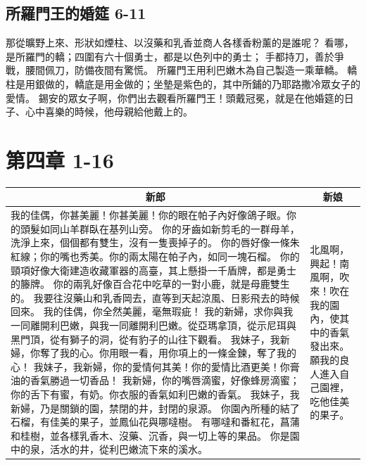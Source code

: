 \subsection{所羅門王的婚筵 6-11}
那從曠野上來、形狀如煙柱、以沒藥和乳香並商人各樣香粉薰的是誰呢？
看哪，是所羅門的轎；四圍有六十個勇士，都是以色列中的勇士；
手都持刀，善於爭戰，腰間佩刀，防備夜間有驚慌。
所羅門王用利巴嫩木為自己製造一乘華轎。
轎柱是用銀做的，轎底是用金做的；坐墊是紫色的，其中所鋪的乃耶路撒冷眾女子的愛情。
錫安的眾女子啊，你們出去觀看所羅門王！頭戴冠冕，就是在他婚筵的日子、心中喜樂的時候，他母親給他戴上的。

\section{第四章    1-16}
\begin{table}[H]
\centering
\begin{tabular}{p{}|p{2.0cm}}\hline\hline
\multicolumn{1}{c|}{新郎}&\multicolumn{1}{c}{新娘}\\\hline
我的佳偶，你甚美麗！你甚美麗！你的眼在帕子內好像鴿子眼。你的頭髮如同山羊群臥在基列山旁。
你的牙齒如新剪毛的一群母羊，洗淨上來，個個都有雙生，沒有一隻喪掉子的。
你的唇好像一條朱紅線；你的嘴也秀美。你的兩太陽在帕子內，如同一塊石榴。
你的頸項好像大衛建造收藏軍器的高臺，其上懸掛一千盾牌，都是勇士的籐牌。
你的兩乳好像百合花中吃草的一對小鹿，就是母鹿雙生的。
我要往沒藥山和乳香岡去，直等到天起涼風、日影飛去的時候回來。
我的佳偶，你全然美麗，毫無瑕疵！
我的新婦，求你與我一同離開利巴嫩，與我一同離開利巴嫩。從亞瑪拿頂，從示尼珥與黑門頂，從有獅子的洞，從有豹子的山往下觀看。
我妹子，我新婦，你奪了我的心。你用眼一看，用你項上的一條金鍊，奪了我的心！
我妹子，我新婦，你的愛情何其美！你的愛情比酒更美！你膏油的香氣勝過一切香品！
我新婦，你的嘴唇滴蜜，好像蜂房滴蜜；你的舌下有蜜，有奶。你衣服的香氣如利巴嫩的香氣。
我妹子，我新婦，乃是關鎖的園，禁閉的井，封閉的泉源。
你園內所種的結了石榴，有佳美的果子，並鳳仙花與哪噠樹。
有哪噠和番紅花，菖蒲和桂樹，並各樣乳香木、沒藥、沉香，與一切上等的果品。
你是園中的泉，活水的井，從利巴嫩流下來的溪水。
&北風啊，興起！南風啊，吹來！吹在我的園內，使其中的香氣發出來。願我的良人進入自己園裡，吃他佳美的果子。\\\hline
\end{tabular}
\end{table}



